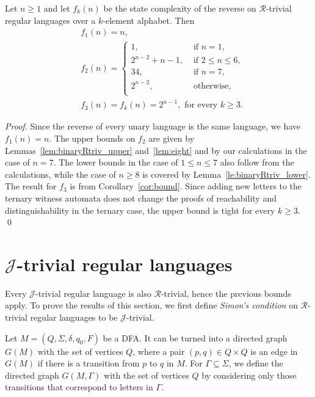 \documentclass[runningheads]{llncs}
\newcommand{\R}{$\mathcal{R}$}
\newcommand{\J}{$\mathcal{J}$}
\begin{document}
  \begin{theorem}\label{thm1}
    Let $n\ge1$ and let $f_k(n)$ be the state complexity of
    the reverse
    on \R-trivial regular languages over a $k$-element alphabet.
    Then
    \begin{align*}
      & f_1(n) = n, \\
      & f_2(n)= \left\{\begin{array}{ll}
                    1,            & \text{ if $n=1$,} \\
                    2^{n-2}+n-1,  & \text{ if $2\le n\le 6$,} \\         
                    34,           & \text{ if $n=7$,} \\
                    2^{n-2},      & \text{ otherwise,} \\
                          \end{array}\right.\\
      &  f_3(n) = f_k(n) = 2^{n-1}, \text{ for every } k\ge3.
    \end{align*}
  \end{theorem}  
  \begin{proof}
    Since the reverse of every unary language is the same language,
    we have $f_1(n)=n$.
    The upper bounds on $f_2$ are given by Lemmas~\ref{lem:binaryRtriv_upper} and~\ref{lem:eight} and by 
    our calculations in the case of $n=7$.
    The lower bounds in the case of $1\le n\le 7$
    also follow from the calculations,
    while the case of $n\ge8$ is covered by Lemma~\ref{le:binaryRtriv_lower}.
    The result for $f_3$ is from Corollary~\ref{cor:bound}.
    Since adding  new letters to the ternary witness automata does not change
    the proofs  of reachability and distinguishability
    in the ternary case,
    the upper bound is tight for every $k\ge 3$.
  \qed
  \end{proof}


\section{\J-trivial regular languages}\label{***Jtriv}
  Every \J-trivial regular language is also \R-trivial, hence the previous bounds apply. To prove the results of this section, we first define {\em Simon's condition\/} on \R-trivial regular languages to be \J-trivial. 
  
  Let $M=(Q,\Sigma,\delta,q_0,F)$ be a DFA. It can be turned into a directed graph $G(M)$ with the set of vertices $Q$, where a pair $(p,q)\in Q\times Q$ is an edge in $G(M)$ if there is a transition from $p$ to $q$ in $M$. For $\Gamma\subseteq \Sigma$, we define the directed graph $G(M,\Gamma)$ with the set of vertices $Q$ by considering only those transitions that correspond to letters in $\Gamma$.
  
\end{document}

